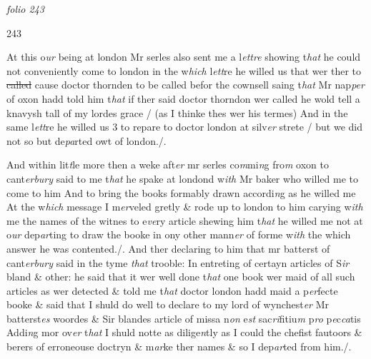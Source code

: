 \documentclass[12pt, a4paper]{book}
\begin{document}
\dotfill
						\newpage
{}

\textit{folio 243}


\begin{flushright}{\color{Mahogany}243}\end{flushright}
 	
				\marginpar[\vspace{0.5cm}{\textcolor{Gray}{Mr Napper}}]{}
			
 	
				\marginpar[\vspace{0.5cm}{\textcolor{Gray}{D. Thorden}}]{}
			

		\ifthenelse{\isodd{\thepage}}
		{\reversemarginpar}
		{\normalmarginpar}
		At this o\textit{ur} being at london Mr serles also sent me a l\textit{ettre} showing t\textit{hat }he
	could not conveniently come to london in the w\textit{hich} l\textit{ett}re he willed
us that wer ther to \sout{called }cause doctor thornden to be called befor
 the cownsell saing t\textit{hat} Mr nap\textit{per} of oxon hadd told him t\textit{hat} if ther said
 doctor thorndon wer called he wold tell a knavysh tall of my lordes
grace / (as I thinke thes wer his termes) And in the same l\textit{ett}re he willed 
us 3 to repare to doctor london at silv\textit{er} strete / but we did not so 
	but de\textit{pa}rted owt of london./.

 	
		\ifthenelse{\isodd{\thepage}}
		{\reversemarginpar}
		{\normalmarginpar}
		And within lit\textit{t}le more then a weke aft\textit{er }mr serles co\textit{m}mi\textit{n}g fro\textit{m} oxon to cant\textit{erbury}
said to me t\textit{hat} he spake at londond w\textit{ith} Mr baker who willed me to come 
to him And to bring the books formably drawn accordi\textit{n}g as he willed
	me At the w\textit{hich} message I m\textit{er}veled gretly \& rode up to london to him
carying w\textit{ith} me the names of the witnes to e\textit{ve}ry article shewing
him t\textit{hat} he willed me not at o\textit{ur} dep\textit{ar}ting to draw the booke in ony
other mann\textit{er} of forme w\textit{ith} the which answer he was contented./. And
ther declaring to him that mr batterst of cant\textit{erbury} said in the tyme \textit{that}
trooble: In entreting of certayn articles of S\textit{ir} bland \& other: he said
that it wer well done t\textit{hat }one book wer maid of all such articles
as wer detected \& told me t\textit{hat} doctor london hadd maid a p\textit{er}fecte
booke \& said that I shuld do well to declare to my lord of wynchest\textit{er}
	Mr batterst\textit{es} woordes \& Sir blandes article of missa n\textit{on} e\textit{st} sac\textit{ri}fitiu\textit{m} p\textit{ro}
p\textit{e}c\textit{ca}tis Addi\textit{n}g mor ov\textit{er} t\textit{hat }I shuld notte as dilige\textit{n}tly as I could 
the chefist fautoors \& berers of erroneouse doctryn \& m\textit{ar}ke ther
names \& so I dep\textit{ar}ted from him./. 
 	
\end{document}
